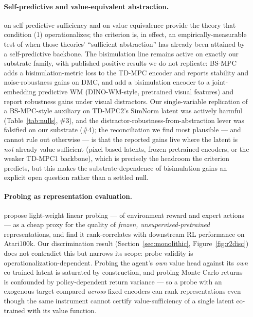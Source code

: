 \documentclass{article}
\begin{document}
\paragraph{Self-predictive and value-equivalent abstraction.} \citet{ni2024bridging} on self-predictive sufficiency and \citet{grimm2020value} on value equivalence provide the theory that condition (1) operationalizes; the criterion is, in effect, an empirically-measurable test of when those theories' ``sufficient abstraction'' has already been attained by a self-predictive backbone. The bisimulation line remains active on exactly our substrate family, with published positive results we do not replicate: BS-MPC \citep{shimizu2025bsmpc} adds a bisimulation-metric loss to the TD-MPC encoder and reports stability and noise-robustness gains on DMC, and \citet{toso2026invariant} add a bisimulation encoder to a joint-embedding predictive WM (DINO-WM-style, pretrained visual features) and report robustness gains under visual distractors. Our single-variable replication of a BS-MPC-style auxiliary on TD-MPC2's SimNorm latent was actively harmful (Table~\ref{tab:nulls}, \#3), and the distractor-robustness-from-abstraction lever was falsified on our substrate (\#4); the reconciliation we find most plausible --- and cannot rule out otherwise --- is that the reported gains live where the latent is \emph{not} already value-sufficient (pixel-based latents, frozen pretrained encoders, or the weaker TD-MPC1 backbone), which is precisely the headroom the criterion predicts, but this makes the substrate-dependence of bisimulation gains an explicit open question rather than a settled null.

\paragraph{Probing as representation evaluation.} \citet{zhang2024lightweight} propose light-weight linear probing --- of environment reward and expert actions --- as a cheap proxy for the quality of \emph{frozen, unsupervised-pretrained} representations, and find it rank-correlates with downstream RL performance on Atari100k. Our discrimination result (Section~\ref{sec:monolithic}, Figure~\ref{fig:r2disc}) does not contradict this but narrows its scope: probe validity is operationalization-dependent. Probing the agent's \emph{own} value head against its \emph{own} co-trained latent is saturated by construction, and probing Monte-Carlo returns is confounded by policy-dependent return variance --- so a probe with an exogenous target compared \emph{across} fixed encoders can rank representations even though the same instrument cannot certify value-sufficiency of a single latent co-trained with its value function.
\end{document}
